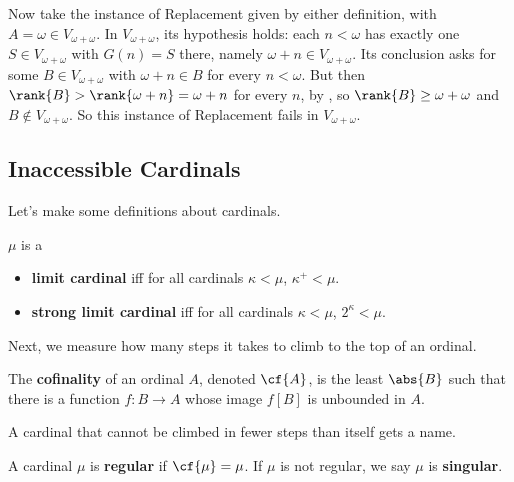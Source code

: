 \begin{boxnexample}
    Now take the instance of Replacement given by either definition, with $A = \omega \in V_{\omega + \omega}$. In $V_{\omega + \omega}$, its hypothesis holds: each $n < \omega$ has exactly one $S \in V_{\omega + \omega}$ with $G(n) = S$ there, namely $\omega + n \in V_{\omega + \omega}$. Its conclusion asks for some $B \in V_{\omega + \omega}$ with $\omega + n \in B$ for every $n < \omega$. But then $\rank{B} > \rank{\omega + n} = \omega + n$ for every $n$, by , so $\rank{B} \geq \omega + \omega$ and $B \notin V_{\omega + \omega}$. So this instance of Replacement fails in $V_{\omega + \omega}$.
\end{boxnexample}

\subsection{Inaccessible Cardinals}

Let's make some definitions about cardinals.

\begin{boxdefinition}
    $\mu$ is a
    \begin{itemize}
        \item \textbf{limit cardinal} iff for all cardinals $\kappa < \mu$, $\kappa^+ < \mu$.
        \item \textbf{strong limit cardinal} iff for all cardinals $\kappa < \mu$, $2^{\kappa} < \mu$.
    \end{itemize}
\end{boxdefinition}

Next, we measure how many steps it takes to climb to the top of an ordinal.

\begin{boxdefinition}[Cofinality]
    The \textbf{cofinality} of an ordinal $A$, denoted $\cf{A}$, is the least $\abs{B}$ such that there is a function $f : B \to A$ whose image $f[B]$ is unbounded in $A$.
\end{boxdefinition}

A cardinal that cannot be climbed in fewer steps than itself gets a name.

\begin{boxdefinition}
    A cardinal $\mu$ is \textbf{regular} if $\cf{\mu} = \mu$. If $\mu$ is not regular, we say $\mu$ is \textbf{singular}.
\end{boxdefinition}

